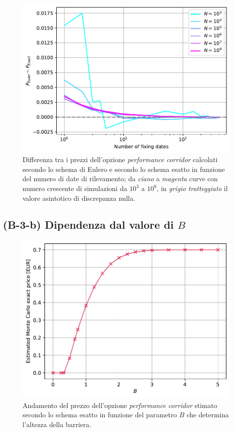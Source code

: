 \begin{figure}[t]
    \centering
    \includegraphics[scale=0.5]{graphs/OptionPriceVsM_DiscrepancyVsM_WithDifferentNs.pdf}
    \caption{Differenza tra i prezzi dell'opzione \textit{performance corridor} calcolati secondo lo schema di Eulero e secondo lo schema esatto in funzione del numero di date di rilevamento; da \textit{ciano} a \textit{magenta} curve con numero crescente di simulazioni da ${10}^3$ a ${10}^8$, in \textit{grigio tratteggiato} il valore asintotico di discrepanza nulla.}
    \label{fig:ex_eul_discrep_M}
\end{figure}

\lipsum[1-3]

\subsection{(B-3-b) Dipendenza dal valore di $B$}

\begin{figure}[t]
    \centering
    \includegraphics[scale=0.5]{graphs/OptionPriceVsB_PriceVsB_N200mln.pdf}
    \caption{Andamento del prezzo dell'opzione \textit{performance corridor} stimato secondo lo schema esatto in funzione del parametro $B$ che determina l'altezza della barriera.}
    \label{fig:price_vs_b}
\end{figure}

